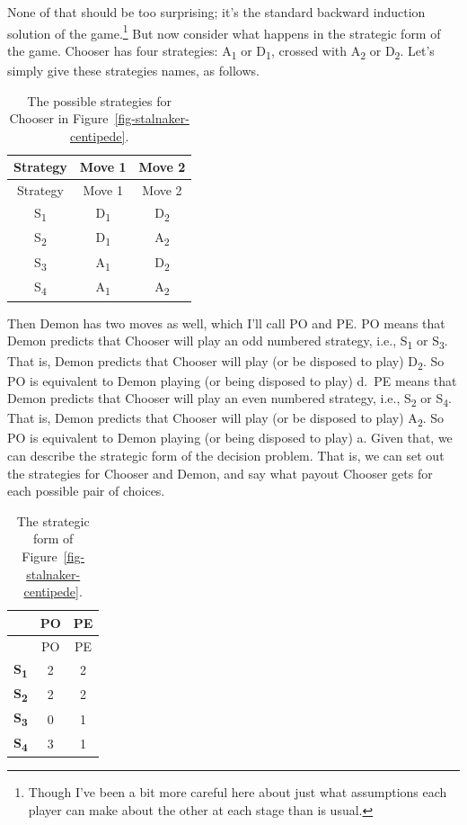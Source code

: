 \documentclass[
  12pt,
  letterpaper,
  DIV=11,
  numbers=noendperiod]{scrreprt}
\begin{document}
None of that should be too surprising; it's the standard backward
induction solution of the game.\footnote{Though I've been a bit more
  careful here about just what assumptions each player can make about
  the other at each stage than is usual.} But now consider what happens
in the strategic form of the game. Chooser has four strategies:
A\textsubscript{1} or D\textsubscript{1}, crossed with
A\textsubscript{2} or D\textsubscript{2}. Let's simply give these
strategies names, as follows.

\begin{longtable}[]{@{}ccc@{}}
\caption{The possible strategies for Chooser in
Figure~\ref{fig-stalnaker-centipede}.}\label{tbl-stalnaker-centipede-strategies}\tabularnewline
\toprule\noalign{}
Strategy & Move 1 & Move 2 \\
\midrule\noalign{}
\endfirsthead
\toprule\noalign{}
Strategy & Move 1 & Move 2 \\
\midrule\noalign{}
\endhead
\bottomrule\noalign{}
\endlastfoot
S\textsubscript{1} & D\textsubscript{1} & D\textsubscript{2} \\
S\textsubscript{2} & D\textsubscript{1} & A\textsubscript{2} \\
S\textsubscript{3} & A\textsubscript{1} & D\textsubscript{2} \\
S\textsubscript{4} & A\textsubscript{1} & A\textsubscript{2} \\
\end{longtable}

Then Demon has two moves as well, which I'll call PO and PE. PO means
that Demon predicts that Chooser will play an odd numbered strategy,
i.e., S\textsubscript{1} or S\textsubscript{3}. That is, Demon predicts
that Chooser will play (or be disposed to play) D\textsubscript{2}. So
PO is equivalent to Demon playing (or being disposed to play) d.~PE
means that Demon predicts that Chooser will play an even numbered
strategy, i.e., S\textsubscript{2} or S\textsubscript{4}. That is, Demon
predicts that Chooser will play (or be disposed to play)
A\textsubscript{2}. So PO is equivalent to Demon playing (or being
disposed to play) a. Given that, we can describe the strategic form of
the decision problem. That is, we can set out the strategies for Chooser
and Demon, and say what payout Chooser gets for each possible pair of
choices.

\begin{longtable}[]{@{}ccc@{}}
\caption{The strategic form of
Figure~\ref{fig-stalnaker-centipede}.}\label{tbl-stalnaker-centipede}\tabularnewline
\toprule\noalign{}
& PO & PE \\
\midrule\noalign{}
\endfirsthead
\toprule\noalign{}
& PO & PE \\
\midrule\noalign{}
\endhead
\bottomrule\noalign{}
\endlastfoot
\textbf{S\textsubscript{1}} & 2 & 2 \\
\textbf{S\textsubscript{2}} & 2 & 2 \\
\textbf{S\textsubscript{3}} & 0 & 1 \\
\textbf{S\textsubscript{4}} & 3 & 1 \\
\end{longtable}
\end{document}
